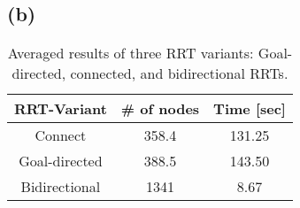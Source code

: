 \documentclass[12pt]{article}
\newcommand{\problemPart}[1]{\subsection*{(#1)}}
\begin{document}
\problemPart{b}
\begin{table}%
\centering
\label{table:results}
\caption{Averaged results of three RRT variants: Goal-directed, connected, and bidirectional RRTs.}
\begin{tabular*}{0.5\textwidth}{c|c|c}
\hline
\bfseries RRT-Variant & \bfseries \# of nodes & \bfseries Time [sec] \\
\hline\hline
Connect 	&  358.4 	& 131.25 	\\ \hline\hline
Goal-directed 	&  388.5 	& 143.50 	\\ \hline\hline
Bidirectional 	&  1341 	& 8.67 		\\ \hline\hline
\hline
\end{tabular*}
\end{table}
\end{document}
